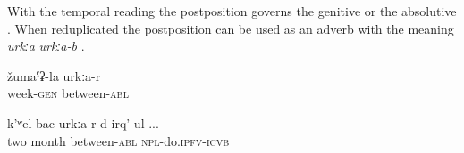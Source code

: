With the temporal reading the postposition governs the genitive  or the absolutive . When reduplicated the postposition can be used as an adverb with the meaning \textit{urkːa} \textit{urkːa-b} .


\begin{exe}
	\ex
	\begin{xlist}
		\ex	\label{withinoneweek}
		\gll	žumaˁʡ-la	urkːa-r  \\
			week-\textsc{gen}	between-\textsc{abl}\\
		\glt	{}

		\ex	\label{After two months they were doing (the medical treatment again}
		\gll	k'ʷel	bac	urkːa-r	d-irq'-ul ...\\
			two	month	between-\textsc{abl}	\textsc{npl}-do.\textsc{ipfv}-\textsc{icvb}\\
		\glt	{}
	\end{xlist}
\end{exe}



\subsection{ }
\label{ssec:postposition bi}

